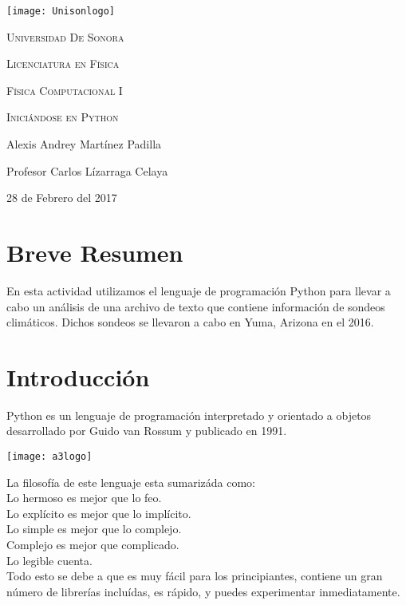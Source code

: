 \documentclass[12pt,a4paper]{article}
\begin{document}
\begin{titlepage}
	\centering
	\texttt{[image: Unisonlogo]}\par
    \vspace{1.3cm}
	\scshape \LARGE Universidad De Sonora \par
	\vspace{1cm}
	\scshape \Large Licenciatura en Física\par
    \scshape \Large Física Computacional I \par
	\vspace{1.5cm}
	\huge \scshape Iniciándose en Python\par
	\vspace{2cm}
	\Large Alexis Andrey Martínez Padilla\par
    \Large Profesor Carlos Lízarraga Celaya\par
    \vspace{2.5cm}
    \Large 28 de Febrero del 2017
\end{titlepage}

\section{Breve Resumen}
En esta actividad utilizamos el lenguaje de programación Python para llevar a cabo un análisis de una archivo de texto que contiene información de sondeos climáticos. Dichos sondeos se llevaron a cabo en Yuma, Arizona en el 2016.

\section{Introducción}
Python es un lenguaje de programación interpretado y orientado a objetos desarrollado por Guido van Rossum y publicado en 1991.

\begin{center}
\texttt{[image: a3logo]}
\end{center}

La filosofía de este lenguaje esta sumarizáda como: \\
Lo hermoso es mejor que lo feo. \\
Lo explícito es mejor que lo implícito. \\
Lo simple es mejor que lo complejo. \\
Complejo es mejor que complicado. \\
Lo legible cuenta. \\

Todo esto se debe a que es muy fácil para los principiantes, contiene un gran número de librerías incluídas, es rápido, y puedes experimentar inmediatamente. \\
\end{document}
